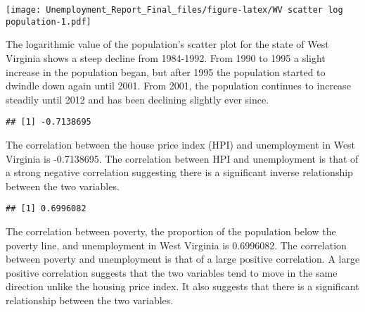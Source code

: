\documentclass[
]{article}
\newenvironment{Shaded}{\begin{snugshade}}{\end{snugshade}}
\newcommand{\KeywordTok}[1]{\textcolor[rgb]{0.13,0.29,0.53}{\textbf{#1}}}
\newcommand{\NormalTok}[1]{#1}
\newcommand{\OperatorTok}[1]{\textcolor[rgb]{0.81,0.36,0.00}{\textbf{#1}}}
\begin{document}
\texttt{[image: Unemployment\_Report\_Final\_files/figure-latex/WV scatter log population-1.pdf]}

The logarithmic value of the population's scatter plot for the state of
West Virginia shows a steep decline from 1984-1992. From 1990 to 1995 a
slight increase in the population began, but after 1995 the population
started to dwindle down again until 2001. From 2001, the population
continues to increase steadily until 2012 and has been declining
slightly ever since.

\begin{Shaded}
\end{Shaded}

\begin{verbatim}
## [1] -0.7138695
\end{verbatim}

The correlation between the house price index (HPI) and unemployment in
West Virginia is -0.7138695. The correlation between HPI and
unemployment is that of a strong negative correlation suggesting there
is a significant inverse relationship between the two variables.

\begin{Shaded}
\end{Shaded}

\begin{verbatim}
## [1] 0.6996082
\end{verbatim}

The correlation between poverty, the proportion of the population below
the poverty line, and unemployment in West Virginia is 0.6996082. The
correlation between poverty and unemployment is that of a large positive
correlation. A large positive correlation suggests that the two
variables tend to move in the same direction unlike the housing price
index. It also suggests that there is a significant relationship between
the two variables.

\begin{Shaded}
\end{Shaded}
\end{document}
